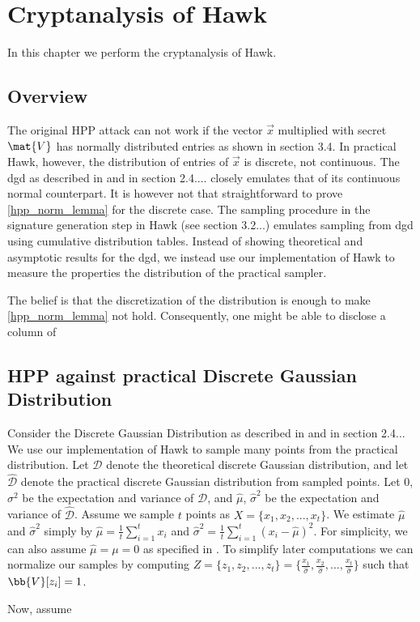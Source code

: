 
\newcommand{\dgd}{\mathcal{D}}
\newcommand{\dgdi}{\widehat{\mathcal{D}}}

\chapter{Cryptanalysis of Hawk}
In this chapter we perform the cryptanalysis of Hawk.
\section{Overview}


The original HPP attack can not work if the vector $\vec{x}$ multiplied with secret $\mat{V}$ has normally distributed entries as shown in section 3.4.
In practical Hawk, however, the distribution of entries of $\vec{x}$ is discrete, not continuous. The \gls{dgd} as described in \cite{HawkSpec24} and in section 2.4.... closely emulates
that of its continuous normal counterpart. It is however not that straightforward to prove \ref{hpp_norm_lemma} for the discrete case.
The sampling procedure in the signature generation step in Hawk (see section 3.2...) emulates sampling from \gls{dgd} using cumulative distribution tables.
Instead of showing theoretical and asymptotic results for the \gls{dgd}, we instead use our implementation of Hawk to measure the properties the distribution of the practical sampler.

The belief is that the discretization of the distribution is enough to make \ref{hpp_norm_lemma} not hold. Consequently, one might be able to disclose a column of

\section{HPP against practical Discrete Gaussian Distribution}
Consider the Discrete Gaussian Distribution as described in \cite{HawkSpec24} and in section 2.4... We use our implementation of Hawk to sample many points from the practical distribution.
Let $\dgd$ denote the theoretical discrete Gaussian distribution, and let $\dgdi$ denote the practical discrete Gaussian distribution from sampled points.
Let $0$, $\sigma^2$ be the expectation and variance of $\dgd$, and $\hat{\mu}$, $\hat{\sigma}^2$ be the expectation and variance of $\dgdi$.
Assume we sample $t$ points as $X = \{x_1, x_2, ..., x_t\}$. We estimate $\hat{\mu}$ and $\hat{\sigma}^2$ simply by $\hat{\mu} = \frac{1}{t} \sum_{i=1}^{t} x_i$ and $\hat{\sigma}^2 = \frac{1}{t} \sum_{i=1}^{t}(x_i - \hat{\mu})^2$.
For simplicity, we can also assume $\hat{\mu} = \mu = 0$ as specified in \cite{HawkSpec24}.
To simplify later computations we can normalize our samples by computing $Z = \{z_1, z_2, ..., z_t\} = \{\frac{x_1}{\hat{\sigma}}, \frac{x_2}{\hat{\sigma}},..., \frac{x_t}{\hat{\sigma}}\}$ such that 
$\bb{V}[z_i] = 1$.

Now, assume
